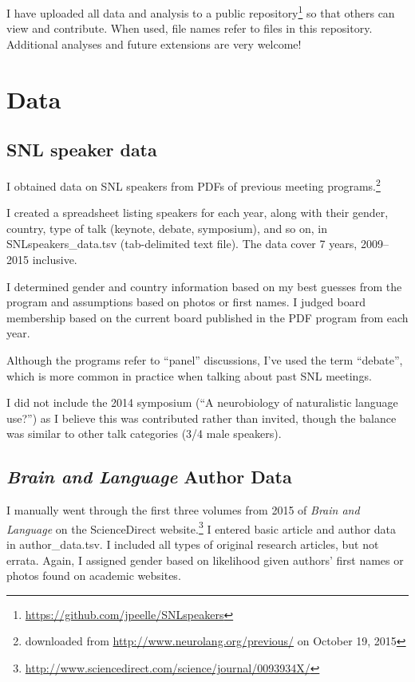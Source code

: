 \documentclass{winnower}
\begin{document}
I have uploaded all data and analysis to a public repository\footnote{\url{https://github.com/jpeelle/SNLspeakers}} so that others can view and contribute. When used, file names refer to files in this repository. Additional analyses and future extensions are very welcome!



\section{Data}

\subsection{SNL speaker data}


I obtained data on SNL speakers from PDFs of previous meeting programs.\footnote{downloaded from \url{http://www.neurolang.org/previous/} on October 19, 2015}

I created a spreadsheet listing speakers for each year, along with their gender, country, type of talk (keynote, debate, symposium), and so on, in {\ttfamily SNLspeakers\_data.tsv} (tab-delimited text file). The data cover 7 years, 2009--2015 inclusive.

I determined gender and country information based on my best guesses from the program and assumptions based on photos or first names. I judged board membership based on the current board published in the PDF program from each year.

Although the programs refer to ``panel'' discussions, I've used the term ``debate'', which is more common in practice when talking about past SNL meetings.

I did not include the 2014 symposium (``A neurobiology of naturalistic language use?'') as I believe this was contributed rather than invited, though the balance was similar to other talk categories (3/4 male speakers).


\subsection{{\itshape Brain and Language} Author Data}


I manually went through the first three volumes from 2015 of {\itshape Brain and Language} on the ScienceDirect website.\footnote{\url{http://www.sciencedirect.com/science/journal/0093934X/}} I entered basic article and author data in {\ttfamily author\_data.tsv}. I included all types of original research articles, but not errata. Again, I assigned gender based on likelihood given authors' first names or photos found on academic websites.
\end{document}
